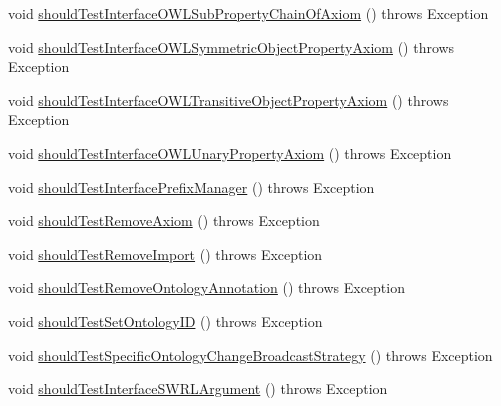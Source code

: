 \begin{DoxyCompactItemize}
\item 
void \hyperlink{classorg_1_1semanticweb_1_1owlapi_1_1contract_1_1_contract_owlapi_model__4_test_ade965eda2c39ada6521475db12d66c83}{should\-Test\-Interface\-O\-W\-L\-Sub\-Property\-Chain\-Of\-Axiom} ()  throws Exception 
\item 
void \hyperlink{classorg_1_1semanticweb_1_1owlapi_1_1contract_1_1_contract_owlapi_model__4_test_a7727f3f025cd62a2b8167b6b4e321652}{should\-Test\-Interface\-O\-W\-L\-Symmetric\-Object\-Property\-Axiom} ()  throws Exception 
\item 
void \hyperlink{classorg_1_1semanticweb_1_1owlapi_1_1contract_1_1_contract_owlapi_model__4_test_a393b51e0d86e8580b78c565d4e6067b4}{should\-Test\-Interface\-O\-W\-L\-Transitive\-Object\-Property\-Axiom} ()  throws Exception 
\item 
void \hyperlink{classorg_1_1semanticweb_1_1owlapi_1_1contract_1_1_contract_owlapi_model__4_test_a83f55d82111bbe0c6ec0838b7a0737a3}{should\-Test\-Interface\-O\-W\-L\-Unary\-Property\-Axiom} ()  throws Exception 
\item 
void \hyperlink{classorg_1_1semanticweb_1_1owlapi_1_1contract_1_1_contract_owlapi_model__4_test_a1d05f0dd4c53ab15fe03810d5b815dce}{should\-Test\-Interface\-Prefix\-Manager} ()  throws Exception 
\item 
void \hyperlink{classorg_1_1semanticweb_1_1owlapi_1_1contract_1_1_contract_owlapi_model__4_test_af326e039ec73a51a6b822dcb4dbd150e}{should\-Test\-Remove\-Axiom} ()  throws Exception 
\item 
void \hyperlink{classorg_1_1semanticweb_1_1owlapi_1_1contract_1_1_contract_owlapi_model__4_test_a4381375842332dfd862ad3fe22ac74fd}{should\-Test\-Remove\-Import} ()  throws Exception 
\item 
void \hyperlink{classorg_1_1semanticweb_1_1owlapi_1_1contract_1_1_contract_owlapi_model__4_test_a3b3042e77bfd4525c03fdbff6a336084}{should\-Test\-Remove\-Ontology\-Annotation} ()  throws Exception 
\item 
void \hyperlink{classorg_1_1semanticweb_1_1owlapi_1_1contract_1_1_contract_owlapi_model__4_test_a48a7db291afe17bb4388cd630f8fe318}{should\-Test\-Set\-Ontology\-I\-D} ()  throws Exception 
\item 
void \hyperlink{classorg_1_1semanticweb_1_1owlapi_1_1contract_1_1_contract_owlapi_model__4_test_a4af9f4ecbf16518d9238802d97dbcdbb}{should\-Test\-Specific\-Ontology\-Change\-Broadcast\-Strategy} ()  throws Exception 
\item 
void \hyperlink{classorg_1_1semanticweb_1_1owlapi_1_1contract_1_1_contract_owlapi_model__4_test_a0b9bc76f5fdd301da8c72759600bf4cf}{should\-Test\-Interface\-S\-W\-R\-L\-Argument} ()  throws Exception 

\end{DoxyCompactItemize}
